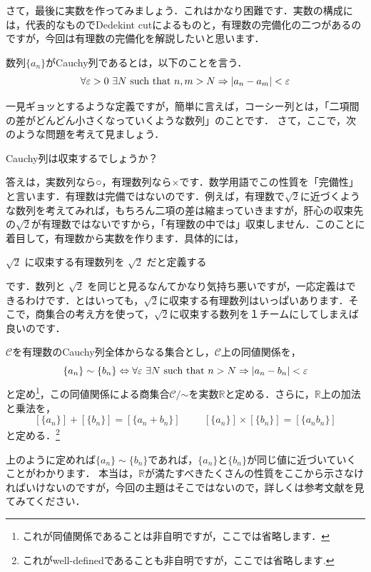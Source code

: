 さて，最後に実数を作ってみましょう．これはかなり困難です．実数の構成には，代表的なものでDedekint cutによるものと，有理数の完備化の二つがあるのですが，今回は有理数の完備化を解説したいと思います．
\begin{defi}[Cauchy列]
 数列$\{a_n\}$がCauchy列であるとは，以下のことを言う．
 \[
  \forall \varepsilon >0 \ \exists N\  {\rm such\ that}\ n,m>N \Rightarrow |a_n-a_m|<\varepsilon
 \]
\end{defi}
一見ギョッとするような定義ですが，簡単に言えば，コーシー列とは，「二項間の差がどんどん小さくなっていくような数列」のことです．
さて，ここで，次のような問題を考えて見ましょう．
\begin{center}
 Cauchy列は収束するでしょうか？
\end{center}
答えは，実数列なら○，有理数列なら×です．数学用語でこの性質を「完備性」と言います．有理数は完備ではないのです．例えば，有理数で$\sqrt{2}$に近づくような数列を考えてみれば，もちろん二項の差は縮まっていきますが，肝心の収束先の$\sqrt{2}$が有理数ではないですから，「有理数の中では」収束しません．このことに着目して，有理数から実数を作ります．具体的には，
\begin{center}
  $\sqrt{2}$ に収束する有理数列を $\sqrt{2}$ だと定義する
\end{center}
です．数列と $\sqrt{2}$ を同じと見るなんてかなり気持ち悪いですが，一応定義はできるわけです．とはいっても，$\sqrt{2}$に収束する有理数列はいっぱいあります．そこで，商集合の考え方を使って，$\sqrt{2}$に収束する数列を１チームにしてしまえば良いのです．
\begin{defi}[実数]
$\mathcal{C}$を有理数のCauchy列全体からなる集合とし，$\mathcal{C}$上の同値関係を，
 \[
 \{a_n\}\sim\{b_n\}\Leftrightarrow \forall\varepsilon\  \exists N\  {\rm such\ that}\ n>N\Rightarrow |a_n-b_n|<\varepsilon
 \]
 と定め\footnote{これが同値関係であることは非自明ですが，ここでは省略します．}，この同値関係による商集合$\mathcal{C}/\mathord{\sim}$を実数$\mathbb{R}$と定める．さらに，$\mathbb{R}$上の加法と乗法を，
 \[
  [\{a_n\}]+[\{b_n\}]=[\{a_n+b_n\}]\hspace{1cm}[\{a_n\}]\times[\{b_n\}]=[\{a_nb_n\}]
 \]
 と定める．\footnote{これがwell-definedであることも非自明ですが，ここでは省略します.}
\end{defi}

上のように定めれば$\{a_n\}\sim\{b_n\}$であれば，$\{a_n\}$と$\{b_n\}$が同じ値に近づいていくことがわかります．
本当は，$\mathbb{R}$が満たすべきたくさんの性質をここから示さなければいけないのですが，今回の主題はそこではないので，詳しくは参考文献を見てみてください．

